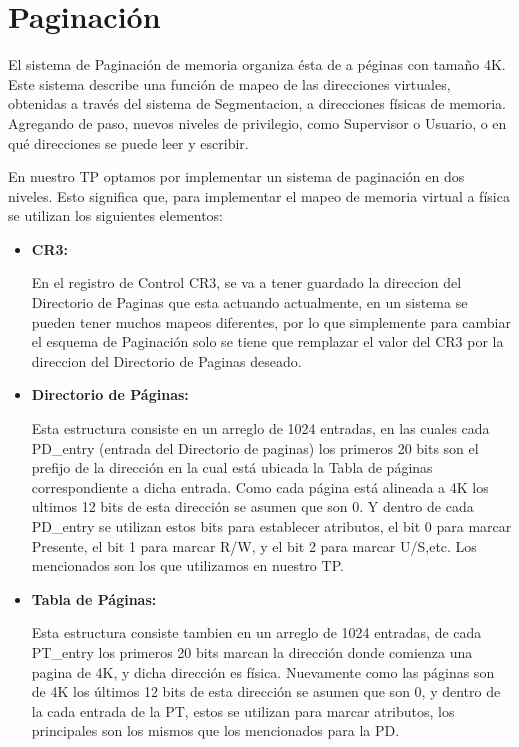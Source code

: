 \section{Paginación}
\par{El sistema de Paginación de memoria organiza ésta de a péginas con tamaño 4K. Este sistema describe una función de mapeo de las direcciones virtuales, obtenidas a través del sistema de Segmentacion, a direcciones físicas de memoria. Agregando de paso, nuevos niveles de privilegio, como Supervisor o Usuario, o en qué direcciones se puede leer y escribir.}
\par{En nuestro TP optamos por implementar un sistema de paginación en dos niveles. Esto significa que, para implementar el mapeo de memoria virtual a física se utilizan los siguientes elementos: }
\begin{itemize}
	\item {\bfseries CR3: }
	\par{ En el registro de Control CR3, se va a tener guardado la direccion del Directorio de Paginas que esta actuando actualmente, en un sistema se pueden tener muchos mapeos diferentes, por lo que simplemente para cambiar el esquema de Paginación solo se tiene que remplazar el valor del CR3 por la direccion del Directorio de Paginas deseado.}
	\item {\bfseries Directorio de Páginas: }
	\par{Esta estructura consiste en un arreglo de 1024 entradas, en las cuales cada PD\_entry (entrada del Directorio de paginas) los primeros 20 bits son el prefijo de la dirección en la cual está ubicada la Tabla de páginas correspondiente a dicha entrada. Como cada página está alineada a 4K los ultimos 12 bits de esta dirección se asumen que son 0. Y dentro de cada PD\_entry se utilizan estos bits para establecer atributos, el bit 0 para marcar Presente, el bit 1 para marcar R/W, y el bit 2 para marcar U/S,etc. Los mencionados son los que utilizamos en nuestro TP.}
	\item {\bfseries Tabla de Páginas: }
	\par{Esta estructura consiste tambien en un arreglo de 1024 entradas, de cada PT\_entry los primeros 20 bits marcan la dirección donde comienza una pagina de 4K, y dicha dirección es física. Nuevamente como las páginas son de 4K los últimos 12 bits de esta dirección se asumen que son 0, y dentro de la cada entrada de la PT, estos se utilizan para marcar atributos, los principales son los mismos que los mencionados para la PD.}
\end{itemize}


